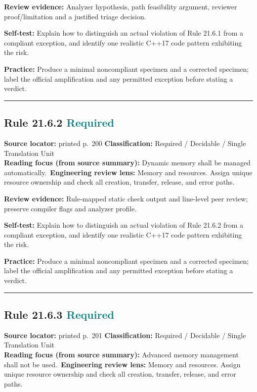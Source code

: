 \documentclass[10pt,letterpaper]{article}
\begin{document}
\textbf{Review evidence:} Analyzer hypothesis, path feasibility argument, reviewer proof/limitation and a justified triage decision.

\textbf{Self-test:} Explain how to distinguish an actual violation of Rule 21.6.1 from a compliant exception, and identify one realistic C++17 code pattern exhibiting the risk.\par
\textbf{Practice:} Produce a minimal noncompliant specimen and a corrected specimen; label the official amplification and any permitted exception before stating a verdict.
\smallskip\hrule\smallskip
\subsection*{Rule 21.6.2 \enspace \texorpdfstring{\small\textcolor{teal}{Required}}{Required}}
\noindent\textbf{Source locator:} printed p.~200 \quad\textbf{Classification:} Required / Decidable / Single Translation Unit\\
\textbf{Reading focus (from source summary):} Dynamic memory shall be managed automatically.\
\textbf{Engineering review lens:} Memory and resources. Assign unique resource ownership and check all creation, transfer, release, and error paths.

\textbf{Review evidence:} Rule-mapped static check output and line-level peer review; preserve compiler flags and analyzer profile.

\textbf{Self-test:} Explain how to distinguish an actual violation of Rule 21.6.2 from a compliant exception, and identify one realistic C++17 code pattern exhibiting the risk.\par
\textbf{Practice:} Produce a minimal noncompliant specimen and a corrected specimen; label the official amplification and any permitted exception before stating a verdict.
\smallskip\hrule\smallskip
\subsection*{Rule 21.6.3 \enspace \texorpdfstring{\small\textcolor{teal}{Required}}{Required}}
\noindent\textbf{Source locator:} printed p.~201 \quad\textbf{Classification:} Required / Decidable / Single Translation Unit\\
\textbf{Reading focus (from source summary):} Advanced memory management shall not be used.\
\textbf{Engineering review lens:} Memory and resources. Assign unique resource ownership and check all creation, transfer, release, and error paths.
\end{document}
